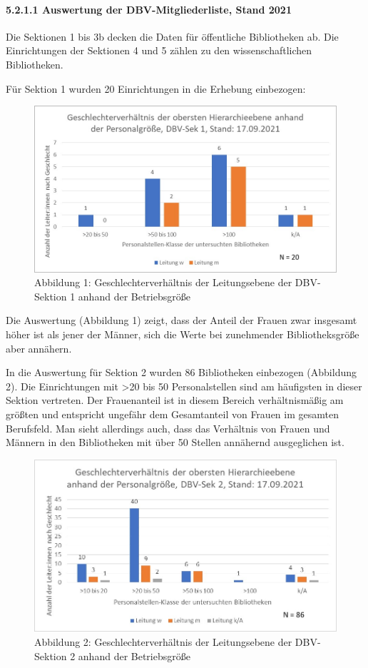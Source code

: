 \documentclass[a4paper,
fontsize=11pt,
oneside,
numbers=noperiodatend,
parskip=half-,
bibliography=totoc,
final
]{scrartcl}
\begin{document}
\paragraph{5.2.1.1 Auswertung der DBV-Mitgliederliste, Stand 2021}

Die Sektionen 1 bis 3b decken die Daten für öffentliche Bibliotheken ab.
Die Einrichtungen der Sektionen 4 und 5 zählen zu den wissenschaftlichen
Bibliotheken.

Für Sektion 1 wurden 20 Einrichtungen in die Erhebung einbezogen:

\begin{figure}
\centering
\includegraphics{img/Abb_01_DBV-Sek1.jpg}
\caption{Abbildung 1: Geschlechterverhältnis der Leitungsebene der
DBV-Sektion 1 anhand der Betriebsgröße}
\end{figure}

Die Auswertung (Abbildung 1) zeigt, dass der Anteil der Frauen zwar
insgesamt höher ist als jener der Männer, sich die Werte bei zunehmender
Bibliotheksgröße aber annähern.

In die Auswertung für Sektion 2 wurden 86 Bibliotheken einbezogen
(Abbildung 2). Die Einrichtungen mit \textgreater20 bis 50
Personalstellen sind am häufigsten in dieser Sektion vertreten. Der
Frauenanteil ist in diesem Bereich verhältnismäßig am größten und
entspricht ungefähr dem Gesamtanteil von Frauen im gesamten Berufsfeld.
Man sieht allerdings auch, dass das Verhältnis von Frauen und Männern in
den Bibliotheken mit über 50 Stellen annähernd ausgeglichen ist.

\begin{figure}
\centering
\includegraphics{img/Abb_02_DBV-Sek2.jpg}
\caption{Abbildung 2: Geschlechterverhältnis der Leitungsebene der
DBV-Sektion 2 anhand der Betriebsgröße}
\end{figure}
\end{document}
